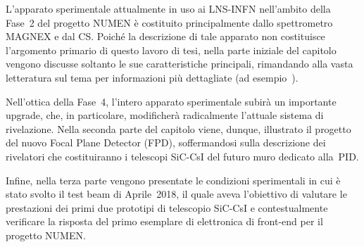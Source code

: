 

L'apparato sperimentale attualmente in uso ai LNS-INFN nell'ambito della Fase~2 del progetto NUMEN è costituito principalmente dallo spettrometro MAGNEX e dal CS.
Poiché la descrizione di tale apparato non costituisce l'argomento primario di questo lavoro di tesi, nella parte iniziale del capitolo vengono discusse soltanto le sue caratteristiche principali, rimandando alla vasta letteratura sul tema per informazioni più dettagliate (ad esempio~\cite{cavallaro:epja12, carbone:epja12, cappuzzello:epja16, cunsolo:epjst07}).

Nell'ottica della Fase~4, l'intero apparato sperimentale subirà un importante upgrade, che, in particolare, modificherà radicalmente l'attuale sistema di rivelazione.
Nella seconda parte del capitolo viene, dunque, illustrato il progetto del nuovo Focal Plane Detector (FPD), soffermandosi sulla descrizione dei rivelatori che costituiranno i telescopi SiC-CsI del futuro muro dedicato alla~PID.


Infine, nella terza parte vengono presentate le condizioni sperimentali in cui è stato svolto il test beam di Aprile~2018, il quale aveva l'obiettivo di valutare le prestazioni dei primi due prototipi di telescopio SiC-CsI e contestualmente verificare la risposta del primo esemplare di elettronica di front-end per il progetto NUMEN.



\section{}

